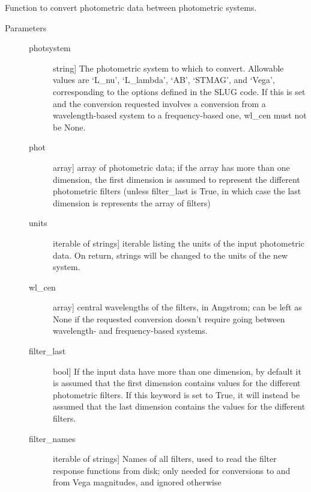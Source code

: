 \documentclass[letterpaper,10pt,english]{sphinxmanual}
\begin{document}
\begin{fulllineitems}
\label{slugpy:slugpy.photometry_convert}
Function to convert photometric data between photometric systems.
\begin{description}
\item[{Parameters}] \leavevmode\begin{description}
\item[{photsystem}] \leavevmode{[}string{]}
The photometric system to which to convert. Allowable values
are `L\_nu', `L\_lambda', `AB', `STMAG', and `Vega',
corresponding to the options defined in the SLUG code. If this
is set and the conversion requested involves a conversion from
a wavelength-based system to a frequency-based one, wl\_cen must
not be None.

\item[{phot}] \leavevmode{[}array{]}
array of photometric data; if the array has more than one
dimension, the first dimension is assumed to represent the
different photometric filters (unless filter\_last is True,
in which case the last dimension is represents the array of
filters)

\item[{units}] \leavevmode{[}iterable of strings{]}
iterable listing the units of the input photometric data. On
return, strings will be changed to the units of the new system.

\item[{wl\_cen}] \leavevmode{[}array{]}
central wavelengths of the filters, in Angstrom; can be left as
None if the requested conversion doesn't require going between
wavelength- and frequency-based systems.

\item[{filter\_last}] \leavevmode{[}bool{]}
If the input data have more than one dimension, by default it
is assumed that the first dimension contains values for the
different photometric filters. If this keyword is set to True,
it will instead be assumed that the last dimension contains the
values for the different filters.

\item[{filter\_names}] \leavevmode{[}iterable of strings{]}
Names of all filters, used to read the filter response
functions from disk; only needed for conversions to and from
Vega magnitudes, and ignored otherwise


\end{description}
\end{description}
\end{fulllineitems}
\end{document}
